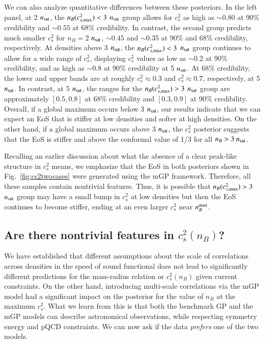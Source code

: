 \documentclass[aps,prd,nofootinbib,tightenlines,notitlepage,floatfix,superscriptaddress,showkeys,twocolumn]{revtex4-1}
\begin{document}
We can also analyze quantitative differences between these posteriors.
In the left panel, at 2 $n_{\rm sat}$,  the  $n_B(c^2_{s,{\rm max}})<3$ $n_{\rm sat}$ group allows for $c_s^2$ as high as $\sim 0.80$ at 90\% credibility and $\sim 0.55$ at 68\% credibility. In contrast, the second group predicts much smaller $c_s^2$ for $n_B=2$ $n_{\rm sat}$, $\sim 0.45$ and $\sim 0.35$ at 90\% and 68\% credibility, respectively. At densities above 3 $n_{\rm sat}$, the $n_B(c^2_{s,{\rm max}})<3$ $n_{\rm sat}$ group continues to allow for a wide range of $c_s^2$, displaying $c_s^2$ values as low as $\sim 0.2$ at 90\% credibility, and as high as $\sim 0.8$ at 90\% credibility at 5 $n_{\rm sat}$. At 68\% credibility, the lower and upper bands are at roughly $c_s^2 \approx 0.3$ and $c_s^2 \approx 0.7$, respectively, at 5 $n_{\rm sat}$. In contrast, at 5 $n_{\rm sat}$, the ranges for the $n_B(c^2_{s,{\rm max}})>3$ $n_{\rm sat}$ group are approximately $[0.5,0.8]$ at 68\% credibility and $[0.3,0.9]$ at 90\% credibility. Overall, if a global maximum occurs below 3 $n_{\rm sat}$, our results indicate that we can expect an EoS that is stiffer at low densities and softer at high densities. On the other hand, if a global maximum occurs above 3 $n_{\rm sat}$, the $c_s^2$ posterior suggests that the EoS is stiffer and above the conformal value of 1/3 for all $n_B>3\ n_{\rm sat}$.

Recalling an earlier discussion about what the absence of a clear peak-like structure in $c_s^2$ means, we emphasize that the EoS in both posteriors shown in Fig.~\ref{fig:cs2twocases} were generated using the mGP framework. Therefore, all these samples contain nontrivial features. Thus, it is possible that $n_B(c^2_{s,{\rm max}})>3$ $n_{\rm sat}$ group may have a small bump in $c_s^2$ at low densities but then the EoS continues to become stiffer, ending at an even larger $c_s^2$ near $n_B^{\rm max}$.


\subsection{Are there nontrivial features in $c_s^2(n_B)$?}

We have established that different assumptions about the scale of correlations across densities in the speed of sound functional does not lead to significantly different predictions for the mass-radius relation or $c_s^2(n_B)$ given current constraints. On the other hand, introducing multi-scale correlations via the mGP model had a significant impact on the posterior for the value of $n_B$ at the maximum $c_s^2$. What we learn from this is that both the benchmark GP and the mGP models can describe astronomical observations, while respecting symmetry energy and pQCD constraints. We can now ask if the data \textit{prefers} one of the two models.
\end{document}
